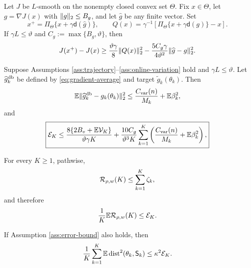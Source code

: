 \begin{lemma}\label{lem:projected-ascent}
Let $J$ be $L$-smooth on the nonempty closed convex set $\Theta$.  Fix $x\in\Theta$, let $g=\nabla J(x)$ with $\lVert g\rVert_2\le B_g$, and let $\widehat g$ be any finite vector.  Set
\[
 x^+=\Pi_\Theta\{x+\gamma\mathsf d(\widehat g)\},
 \qquad
 Q(x)=\gamma^{-1}[\Pi_\Theta\{x+\gamma\mathsf d(g)\}-x].
\]
If $\gamma L\le\vartheta$ and $C_g:=\max\{B_g,\vartheta\}$, then
\begin{equation}\label{eq:one-step-ascent}
 J(x^+)-J(x)
 \ge\frac{\vartheta\gamma}{8}\lVert Q(x)\rVert_2^2
 -\frac{5C_g\gamma}{4\vartheta^2}\lVert\widehat g-g\rVert_2^2.
\end{equation}
\end{lemma}

\begin{theorem}\label{thm:online-residual}
Suppose Assumptions \ref{ass:trajectory}--\ref{ass:online-variation} hold and $\gamma L\le\vartheta$.  Let $\widehat g_k^{\mathrm{db}}$ be defined by \eqref{eq:gradient-average} and target $\widetilde g_k(\theta_k)$.  Then
\begin{equation}\label{eq:true-gradient-mse}
 \mathbb E\lVert\widehat g_k^{\mathrm{db}}-g_k(\theta_k)\rVert_2^2
 \le\frac{C_{\rm var}(n)}{M_k}+\mathbb E\beta_k^2,
\end{equation}
and
\begin{equation}\label{eq:online-residual-bound}
 \boxed{
 \mathcal E_K
 \le
 \frac{8\{2B_v+\mathbb E\mathcal V_K\}}{\vartheta\gamma K}
 +\frac{10C_g}{\vartheta^3K}
 \sum_{k=1}^{K}
 \left(\frac{C_{\rm var}(n)}{M_k}+\mathbb E\beta_k^2\right),
 }
\end{equation}
\end{theorem}

\begin{corollary}\label{cor:dynamic-local-regret}
For every $K\ge1$, pathwise,
\begin{equation}\label{eq:dynamic-local-regret-bound}
 \mathcal R_{\rho,w}(K)
 \le\sum_{k=1}^{K}\zeta_k,
\end{equation}
and therefore
\begin{equation}\label{eq:average-dynamic-local-regret-bound}
 \frac1K\mathbb E\mathcal R_{\rho,w}(K)
 \le\mathcal E_K.
\end{equation}
\end{corollary}

\begin{corollary}\label{cor:stationary-tracking}
If Assumption \ref{ass:error-bound} also holds, then
\begin{equation}\label{eq:stationary-tracking}
 \frac1K\sum_{k=1}^{K}
 \mathbb E\operatorname{dist}^2(\theta_k,\mathsf S_k)
 \le\kappa^2\mathcal E_K.
\end{equation}
\end{corollary}

